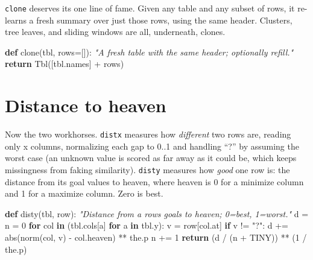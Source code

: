 \documentclass[
  justified]{tufte-book}
\newenvironment{Shaded}{}{}
\newcommand{\BuiltInTok}[1]{\textcolor[rgb]{0.00,0.50,0.00}{#1}}
\newcommand{\CommentTok}[1]{\textcolor[rgb]{0.38,0.63,0.69}{\textit{#1}}}
\newcommand{\ControlFlowTok}[1]{\textcolor[rgb]{0.00,0.44,0.13}{\textbf{#1}}}
\newcommand{\DecValTok}[1]{\textcolor[rgb]{0.25,0.63,0.44}{#1}}
\newcommand{\KeywordTok}[1]{\textcolor[rgb]{0.00,0.44,0.13}{\textbf{#1}}}
\newcommand{\NormalTok}[1]{#1}
\newcommand{\OperatorTok}[1]{\textcolor[rgb]{0.40,0.40,0.40}{#1}}
\newcommand{\StringTok}[1]{\textcolor[rgb]{0.25,0.44,0.63}{#1}}
\begin{document}
\texttt{clone} deserves its one line of fame. Given any table and any
subset of rows, it re-learns a fresh summary over just those rows, using
the same header. Clusters, tree leaves, and sliding windows are all,
underneath, clones.

\begin{Shaded}
\begin{Highlighting}[]
\KeywordTok{def}\NormalTok{ clone(tbl, rows}\OperatorTok{=}\NormalTok{[]):}
  \CommentTok{"A fresh table with the same header; optionally refill."}
  \ControlFlowTok{return}\NormalTok{ Tbl([tbl.names] }\OperatorTok{+}\NormalTok{ rows)}
\end{Highlighting}
\end{Shaded}

\section{Distance to heaven}\label{distance-to-heaven}

Now the two workhorses. \texttt{distx} measures how \emph{different} two
rows are, reading only x columns, normalizing each gap to 0..1 and
handling ``?'' by assuming the worst case (an unknown value is scored as
far away as it could be, which keeps missingness from faking
similarity). \texttt{disty} measures how \emph{good} one row is: the
distance from its goal values to heaven, where heaven is 0 for a
minimize column and 1 for a maximize column. Zero is best.

\begin{Shaded}
\begin{Highlighting}[]
\KeywordTok{def}\NormalTok{ disty(tbl, row):}
  \CommentTok{"Distance from a row\textquotesingle{}s goals to heaven; 0=best, 1=worst."}
\NormalTok{  d }\OperatorTok{=}\NormalTok{ n }\OperatorTok{=} \DecValTok{0}
  \ControlFlowTok{for}\NormalTok{ col }\KeywordTok{in}\NormalTok{ (tbl.cols[a] }\ControlFlowTok{for}\NormalTok{ a }\KeywordTok{in}\NormalTok{ tbl.y):}
\NormalTok{    v }\OperatorTok{=}\NormalTok{ row[col.at]}
    \ControlFlowTok{if}\NormalTok{ v }\OperatorTok{!=} \StringTok{"?"}\NormalTok{:}
\NormalTok{      d }\OperatorTok{+=} \BuiltInTok{abs}\NormalTok{(norm(col, v) }\OperatorTok{{-}}\NormalTok{ col.heaven) }\OperatorTok{**}\NormalTok{ the.p}
\NormalTok{      n }\OperatorTok{+=} \DecValTok{1}
  \ControlFlowTok{return}\NormalTok{ (d }\OperatorTok{/}\NormalTok{ (n }\OperatorTok{+}\NormalTok{ TINY)) }\OperatorTok{**}\NormalTok{ (}\DecValTok{1} \OperatorTok{/}\NormalTok{ the.p)}
\end{Highlighting}
\end{Shaded}
\end{document}
